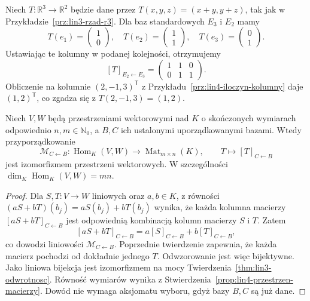 \begin{przyklad}
\label{prz:lin4-macierz-z-obrazow}
Niech \(T\colon\mathbb R^3\to\mathbb R^2\)
będzie dane przez \(T(x,y,z)=(x+y,y+z)\),
tak jak w Przykładzie~\ref{prz:lin3-rzad-r3}.
Dla baz standardowych \(E_3\) i \(E_2\) mamy
\[
 T(e_1)=\begin{pmatrix}1\\0\end{pmatrix},
 \quad T(e_2)=\begin{pmatrix}1\\1\end{pmatrix},
 \quad T(e_3)=\begin{pmatrix}0\\1\end{pmatrix}.
\]
Ustawiając te kolumny w podanej kolejności,
otrzymujemy
\[
 [T]_{E_2\leftarrow E_3}
 =\begin{pmatrix}1&1&0\\0&1&1\end{pmatrix}.
\]
Obliczenie na kolumnie \((2,-1,3)^{\mathsf T}\)
z Przykładu~\ref{prz:lin4-iloczyn-kolumny}
daje \((1,2)^{\mathsf T}\), co zgadza się
z \(T(2,-1,3)=(1,2)\).
\end{przyklad}

\begin{twierdzenie}
\label{thm:lin4-hom-mat}
Niech \(V,W\) będą przestrzeniami wektorowymi
nad \(K\) o skończonych wymiarach odpowiednio
\(n,m\in\mathbb N_0\), a \(B,C\)
ich ustalonymi uporządkowanymi bazami.
Wtedy przyporządkowanie
\[
 \mathcal M_{C\leftarrow B}\colon
 \operatorname{Hom}_K(V,W)
 \longrightarrow\operatorname{Mat}_{m\times n}(K),
 \qquad T\longmapsto[T]_{C\leftarrow B}
\]
jest izomorfizmem przestrzeni wektorowych.
W szczególności
\(\dim_K\operatorname{Hom}_K(V,W)=mn\).
\end{twierdzenie}
\begin{proof}
Dla \(S,T\colon V\to W\) liniowych
oraz \(a,b\in K\), z równości
\((aS+bT)(b_j)=aS(b_j)+bT(b_j)\)
wynika, że każda kolumna macierzy
\([aS+bT]_{C\leftarrow B}\)
jest odpowiednią kombinacją kolumn
macierzy \(S\) i \(T\).
Zatem
\[
 [aS+bT]_{C\leftarrow B}
 =a[S]_{C\leftarrow B}
  +b[T]_{C\leftarrow B},
\]
co dowodzi liniowości \(\mathcal M_{C\leftarrow B}\).
Poprzednie twierdzenie zapewnia, że
każda macierz pochodzi od dokładnie jednego \(T\).
Odwzorowanie jest więc bijektywne.
Jako liniowa bijekcja jest izomorfizmem
na mocy Twierdzenia~\ref{thm:lin3-odwrotnosc}.
Równość wymiarów wynika z
Stwierdzenia~\ref{prop:lin4-przestrzen-macierzy}.
Dowód nie wymaga aksjomatu wyboru,
gdyż bazy \(B,C\) są już dane.
\end{proof}

